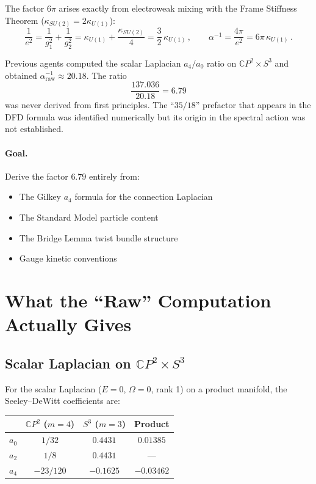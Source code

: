 \documentclass[12pt,a4paper]{article}
\theoremstyle{definition}
\begin{document}
The factor $6\pi$ arises exactly from electroweak mixing with the
Frame Stiffness Theorem ($\kappa_{SU(2)} = 2\kappa_{U(1)}$):
\begin{equation}
\frac{1}{e^2} = \frac{1}{g_1^2} + \frac{1}{g_2^2}
= \kappa_{U(1)} + \frac{\kappa_{SU(2)}}{4}
= \frac{3}{2}\,\kappa_{U(1)}\,,
\qquad
\alpha^{-1} = \frac{4\pi}{e^2} = 6\pi\,\kappa_{U(1)}\,.
\end{equation}

Previous agents computed the scalar Laplacian $a_4/a_0$ ratio on
$\mathbb{C}P^2 \times S^3$ and obtained $\alpha^{-1}_{\mathrm{raw}} \approx 20.18$.
The ratio
\begin{equation}\label{eq:679-ratio}
\frac{137.036}{20.18} = 6.79
\end{equation}
was never derived from first principles.  The ``$35/18$'' prefactor that
appears in the DFD formula was identified numerically but its origin in the
spectral action was not established.

\paragraph{Goal.} Derive the factor $6.79$ entirely from:
\begin{itemize}
\item The Gilkey $a_4$ formula for the connection Laplacian
\item The Standard Model particle content
\item The Bridge Lemma twist bundle structure
\item Gauge kinetic conventions
\end{itemize}

\section{What the ``Raw'' Computation Actually Gives}
\label{sec:raw}

\subsection{Scalar Laplacian on $\mathbb{C}P^2 \times S^3$}

For the scalar Laplacian ($E = 0$, $\Omega = 0$, rank 1) on a product
manifold, the Seeley--DeWitt coefficients are:

\begin{center}
\renewcommand{\arraystretch}{1.3}
\begin{tabular}{lccc}
\toprule
& $\mathbb{C}P^2$ ($m=4$) & $S^3$ ($m=3$) & Product \\
\midrule
$a_0$ & $1/32$ & $0.4431$ & $0.01385$ \\
$a_2$ & $1/8$ & $0.4431$ & --- \\
$a_4$ & $-23/120$ & $-0.1625$ & $-0.03462$ \\
\bottomrule
\end{tabular}
\end{center}
\end{document}
